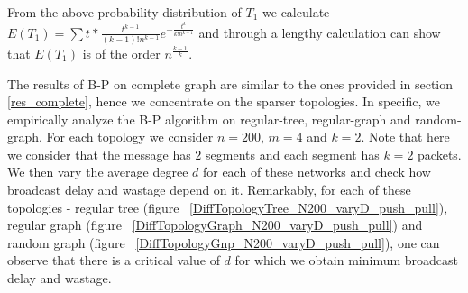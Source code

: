 From the above probability distribution of $T_{1}$ we calculate $E(T_{1})=\sum t*\frac{t^{k-1}}{\left( k-1\right) !n^{k-1}}e^{-\frac{t^{k}}{k!n^{k-1}}}$
and through a lengthy calculation can show that $E(T_{1})$ is of the order $n^{\frac{k-1}{k}}$.
 
 \vspace{-2mm}
 \fi
The results of B-P on complete graph are similar to the ones provided in section \ref{res_complete}, hence we concentrate on the sparser topologies. 
In specific, we empirically analyze the B-P algorithm on regular-tree, regular-graph and random-graph. For each topology we consider $n=200$, $m = 4$ and $k=2$.
Note that here we consider that the message has $2$ segments and each segment has $k=2$ packets. 
We then vary the average degree $d$ for each of these networks and check how broadcast delay and wastage depend on it. Remarkably, for each of these topologies 
- regular tree (figure ~\ref{DiffTopologyTree_N200_varyD_push_pull}), regular graph (figure ~\ref{DiffTopologyGraph_N200_varyD_push_pull}) and random graph 
(figure ~\ref{DiffTopologyGnp_N200_varyD_push_pull}), one can observe that there is a critical value of $d$ for which we obtain minimum broadcast delay and 
wastage.
% 
